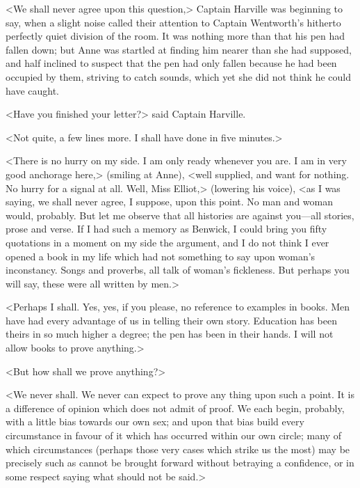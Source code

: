 <We shall never agree upon this question,> Captain Harville was beginning to say, when a slight noise called their attention to Captain Wentworth's hitherto perfectly quiet division of the room. It was nothing more than that his pen had fallen down; but Anne was startled at finding him nearer than she had supposed, and half inclined to suspect that the pen had only fallen because he had been occupied by them, striving to catch sounds, which yet she did not think he could have caught.

<Have you finished your letter?> said Captain Harville.

<Not quite, a few lines more. I shall have done in five minutes.>

<There is no hurry on my side. I am only ready whenever you are. I am in very good anchorage here,> (smiling at Anne), <well supplied, and want for nothing. No hurry for a signal at all. Well, Miss Elliot,> (lowering his voice), <as I was saying, we shall never agree, I suppose, upon this point. No man and woman would, probably. But let me observe that all histories are against you—all stories, prose and verse. If I had such a memory as Benwick, I could bring you fifty quotations in a moment on my side the argument, and I do not think I ever opened a book in my life which had not something to say upon woman's inconstancy. Songs and proverbs, all talk of woman's fickleness. But perhaps you will say, these were all written by men.>

<Perhaps I shall. Yes, yes, if you please, no reference to examples in books. Men have had every advantage of us in telling their own story. Education has been theirs in so much higher a degree; the pen has been in their hands. I will not allow books to prove anything.>

<But how shall we prove anything?>

<We never shall. We never can expect to prove any thing upon such a point. It is a difference of opinion which does not admit of proof. We each begin, probably, with a little bias towards our own sex; and upon that bias build every circumstance in favour of it which has occurred within our own circle; many of which circumstances (perhaps those very cases which strike us the most) may be precisely such as cannot be brought forward without betraying a confidence, or in some respect saying what should not be said.>

